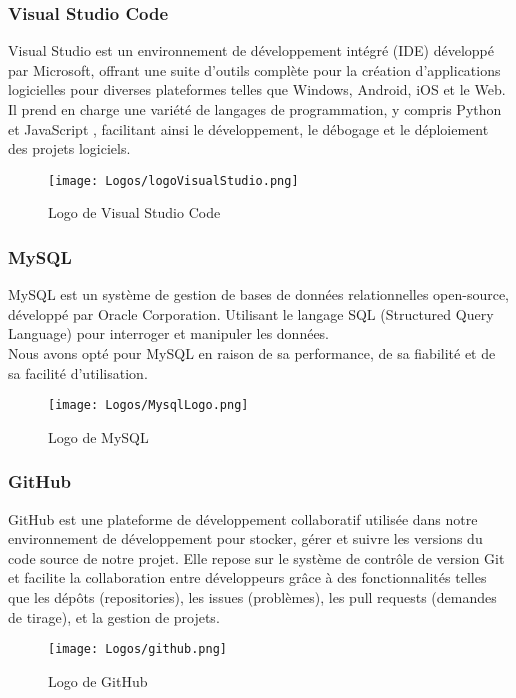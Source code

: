 \subsubsection*{Visual Studio Code}
Visual Studio est un environnement de développement intégré (IDE) développé par Microsoft, offrant une suite d'outils complète pour la création d'applications logicielles pour diverses plateformes telles que Windows, Android, iOS et le Web. Il prend en charge une variété de langages de programmation, y compris Python et JavaScript , facilitant ainsi le développement, le débogage et le déploiement des projets logiciels.\\
\begin{figure}[H]
      \centering
        \texttt{[image: Logos/logoVisualStudio.png]}
        \caption{Logo de Visual Studio Code}
\end{figure}

\subsubsection*{MySQL}
MySQL est un système de gestion de bases de données relationnelles open-source, développé par Oracle Corporation. Utilisant le langage SQL (Structured Query Language) pour interroger et manipuler les données.\\
Nous avons opté pour MySQL en raison de sa performance, de sa fiabilité et de sa facilité d'utilisation.\\
\begin{figure}[H]
      \centering
        \texttt{[image: Logos/MysqlLogo.png]}
        \caption{Logo de MySQL}
\end{figure}
\subsubsection*{GitHub}
GitHub est une plateforme de développement collaboratif utilisée dans notre environnement de développement pour stocker, gérer et suivre les versions du code source de notre projet. Elle repose sur le système de contrôle de version Git et facilite la collaboration entre développeurs grâce à des fonctionnalités telles que les dépôts (repositories), les issues (problèmes), les pull requests (demandes de tirage), et la gestion de projets.\\
\begin{figure}[H]
      \centering
        \texttt{[image: Logos/github.png]}
        \caption{Logo de GitHub}
\end{figure}
\newpage
\newpage
